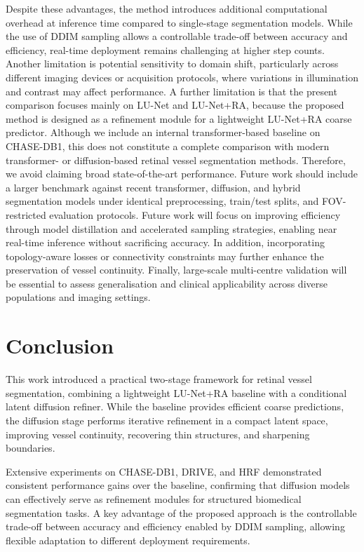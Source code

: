 \documentclass[journal,article,submit,pdftex,moreauthors]{Definitions/mdpi}
\begin{document}
Despite these advantages, the method introduces additional computational overhead at inference time compared to single-stage segmentation models. While the use of DDIM sampling allows a controllable trade-off between accuracy and efficiency, real-time deployment remains challenging at higher step counts. Another limitation is potential sensitivity to domain shift, particularly across different imaging devices or acquisition protocols, where variations in illumination and contrast may affect performance.
A further limitation is that the present comparison focuses mainly on LU-Net and LU-Net+RA, because the proposed method is designed as a refinement module for a lightweight LU-Net+RA coarse predictor. Although we include an internal transformer-based baseline on CHASE-DB1, this does not constitute a complete comparison with modern transformer- or diffusion-based retinal vessel segmentation methods. Therefore, we avoid claiming broad state-of-the-art performance. Future work should include a larger benchmark against recent transformer, diffusion, and hybrid segmentation models under identical preprocessing, train/test splits, and FOV-restricted evaluation protocols.
Future work will focus on improving efficiency through model distillation and accelerated sampling strategies, enabling near real-time inference without sacrificing accuracy. In addition, incorporating topology-aware losses or connectivity constraints may further enhance the preservation of vessel continuity. Finally, large-scale multi-centre validation will be essential to assess generalisation and clinical applicability across diverse populations and imaging settings.



\section{Conclusion}
\label{sec:conclusion}

This work introduced a practical two-stage framework for retinal vessel segmentation, combining a lightweight LU-Net+RA baseline with a conditional latent diffusion refiner. While the baseline provides efficient coarse predictions, the diffusion stage performs iterative refinement in a compact latent space, improving vessel continuity, recovering thin structures, and sharpening boundaries.

Extensive experiments on CHASE-DB1, DRIVE, and HRF demonstrated consistent performance gains over the baseline, confirming that diffusion models can effectively serve as refinement modules for structured biomedical segmentation tasks. A key advantage of the proposed approach is the controllable trade-off between accuracy and efficiency enabled by DDIM sampling, allowing flexible adaptation to different deployment requirements.
\end{document}

